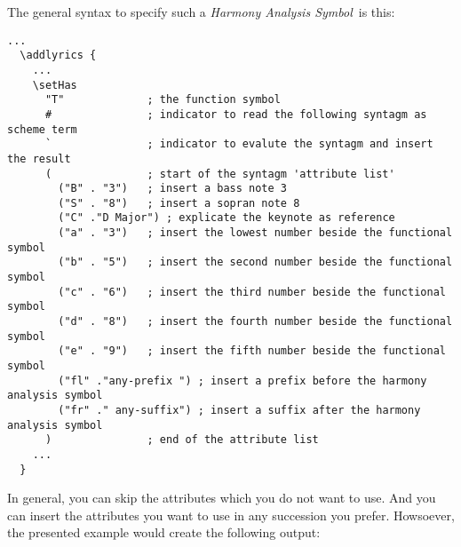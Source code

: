 \documentclass[
  DIV=calc,
  BCOR=5mm,
  12pt,
  headings=small,
  oneside,
  abstract=true,
  toc=bib,
  xcolor=dvipsnames,
  openany,
  english]{scrartcl}
\newcommand{\has}[1]{\textit{Harmony Analysis Symbol#1}}
\begin{document}
\begin{center}
\end{center}

The general syntax to specify such a \has{}\ is this:

\begin{scriptsize}
\begin{verbatim}
...
  \addlyrics {
    ...
    \setHas
      "T"             ; the function symbol
      #               ; indicator to read the following syntagm as scheme term
      `               ; indicator to evalute the syntagm and insert the result
      (               ; start of the syntagm 'attribute list'
        ("B" . "3")   ; insert a bass note 3
        ("S" . "8")   ; insert a sopran note 8
        ("C" ."D Major") ; explicate the keynote as reference
        ("a" . "3")   ; insert the lowest number beside the functional symbol
        ("b" . "5")   ; insert the second number beside the functional symbol
        ("c" . "6")   ; insert the third number beside the functional symbol
        ("d" . "8")   ; insert the fourth number beside the functional symbol
        ("e" . "9")   ; insert the fifth number beside the functional symbol
        ("fl" ."any-prefix ") ; insert a prefix before the harmony analysis symbol
        ("fr" ." any-suffix") ; insert a suffix after the harmony analysis symbol
      )               ; end of the attribute list
    ...
  }
\end{verbatim}
\end{scriptsize}

In general, you can skip the attributes which you do not want to use. And you
can insert the attributes you want to use in any succession you prefer.
Howsoever, the presented example would create the following output:
\end{document}
